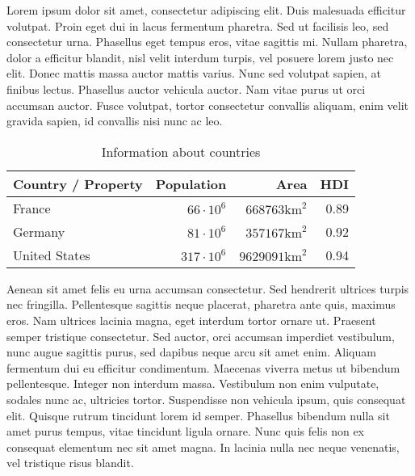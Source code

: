 \documentclass[a4paper]{scrartcl}
\begin{document}
Lorem ipsum dolor sit amet, consectetur adipiscing elit. Duis malesuada
efficitur volutpat. Proin eget dui in lacus fermentum pharetra. Sed ut
facilisis leo, sed consectetur urna. Phasellus eget tempus eros, vitae
sagittis mi. Nullam pharetra, dolor a efficitur blandit, nisl velit interdum
turpis, vel posuere lorem justo nec elit. Donec mattis massa auctor mattis
varius. Nunc sed volutpat sapien, at finibus lectus. Phasellus auctor vehicula
auctor. Nam vitae purus ut orci accumsan auctor. Fusce volutpat, tortor
consectetur convallis aliquam, enim velit gravida sapien, id convallis nisi
nunc ac leo.

    \begin{table}[ht]
        \centering
        \begin{tabular}{l|rrr}
        \toprule
        Country / Property & Population       & Area     & HDI \\\midrule
        France             & $66 \cdot 10^6$  & $668763\text{km}^2$  & 0.89 \\
        Germany            & $81 \cdot 10^6$  & $357167\text{km}^2$  & 0.92 \\
        United States      & $317 \cdot 10^6$ & $9629091\text{km}^2$ & 0.94 \\
        \bottomrule
        \end{tabular}
        \caption{Information about countries}
        \label{table:countries}
    \end{table}

Aenean sit amet felis eu urna accumsan consectetur. Sed hendrerit ultrices
turpis nec fringilla. Pellentesque sagittis neque placerat, pharetra ante
quis, maximus eros. Nam ultrices lacinia magna, eget interdum tortor ornare
ut. Praesent semper tristique consectetur. Sed auctor, orci accumsan imperdiet
vestibulum, nunc augue sagittis purus, sed dapibus neque arcu sit amet enim.
Aliquam fermentum dui eu efficitur condimentum. Maecenas viverra metus ut
bibendum pellentesque. Integer non interdum massa. Vestibulum non enim
vulputate, sodales nunc ac, ultricies tortor. Suspendisse non vehicula ipsum,
quis consequat elit. Quisque rutrum tincidunt lorem id semper. Phasellus
bibendum nulla sit amet purus tempus, vitae tincidunt ligula ornare. Nunc quis
felis non ex consequat elementum nec sit amet magna. In lacinia nulla nec neque
venenatis, vel tristique risus blandit.
\end{document}
